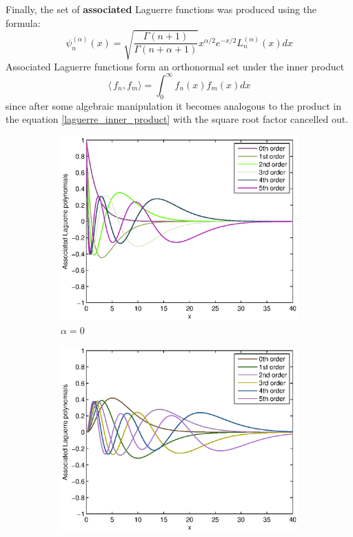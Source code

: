 \documentclass[a4paper]{article}
\numberwithin{equation}{section}
\begin{document}
Finally, the set of \textbf{associated} Laguerre functions was produced using the formula:
\begin{equation} \label{associated_laguerre_definition}
\psi_n^{(\alpha)}(x) = \sqrt{\frac{\Gamma(n+1)}{\Gamma(n+\alpha+1)}} x^{\alpha/2} e^{-x/2} L_n^{(\alpha)}(x) dx
\end{equation}
Associated Laguerre functions form an orthonormal set under the inner product \begin{equation} \label{inner_product}
\langle\,f_n, f_m \rangle = \int_{0}^{\infty}f_n(x)f_m(x)dx
\end{equation}
since after some algebraic manipulation it becomes analogous to the product in the equation \ref{laguerre_inner_product} with the square root factor cancelled out.

\begin{figure}[!ht]	
	\centering
	\begin{subfigure}[t]{.45\textwidth}
		\centering
		\includegraphics[width=\textwidth]{associated_laguerre}
		\caption{$\alpha=0$}		
	\end{subfigure}
	\quad
	\begin{subfigure}[t]{.45\textwidth}
		\centering
		\includegraphics[width=\textwidth]{associated_laguerre_alpha5}

\end{subfigure}
\end{figure}
\end{document}
